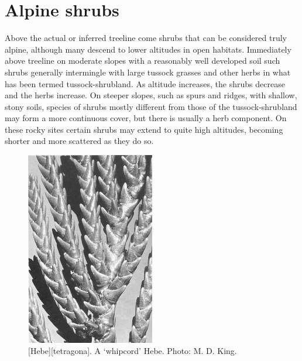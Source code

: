 \section{Alpine shrubs}

Above the actual or inferred treeline come shrubs that can be considered truly alpine, although many descend to lower altitudes in open habitats.
Immediately above treeline on moderate slopes with a reasonably well developed soil such shrubs generally intermingle with large tussock grasses and other herbs in what has been termed tussock-shrubland.
As altitude increases, the shrubs decrease and the herbs increase.
On steeper slopes, such as spurs and ridges, with shallow, stony soils, species of shrubs mostly different from those of the tussock-shrubland may form a more continuous cover, but there is usually a herb component.
On these rocky sites certain shrubs may extend to quite high altitudes, becoming shorter and more scattered as they do so.

\begin{figure}
	\includegraphics[width=0.5\textwidth]{graphics/figure93hebe.jpg}
	\centering
	\caption[\emph{Hebe tetragon}]{[Hebe][tetragona].
	A `whipcord' Hebe.
	Photo: M. D. King.}%
	\label{fig:93hebe}
\end{figure}

